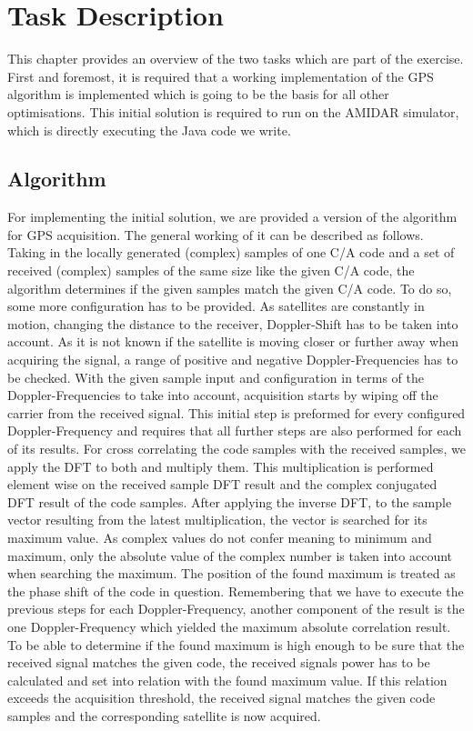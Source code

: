 \chapter{Task Description}
\label{cha:task}
	This chapter provides an overview of the two tasks which are part of the exercise.
	First and foremost, it is required that a working implementation of the GPS algorithm is implemented which is going to be the basis for all other optimisations. This initial solution is required to run on the AMIDAR simulator, which is directly executing the Java code we write.

	\section{Algorithm} %
	\label{sec:task_algorithm}
		For implementing the initial solution, we are provided a version of the algorithm for GPS acquisition. The general working of it can be described as follows.
		Taking in the locally generated (complex) samples of one C/A code and a set of received (complex) samples of the same size like the given C/A code, the algorithm determines if the given samples match the given C/A code. 
		To do so, some more configuration has to be provided. As satellites are constantly in motion, changing the distance to the receiver, Doppler-Shift has to be taken into account. As it is not known if the satellite is moving closer or further away when acquiring the signal, a range of positive and negative Doppler-Frequencies has to be checked. With the given sample input and configuration in terms of the Doppler-Frequencies to take into account, acquisition starts by wiping off the carrier from the received signal. This initial step is preformed for every configured Doppler-Frequency and requires that all further steps are also performed for each of its results. 
		For cross correlating the code samples with the received samples, we apply the DFT to both and multiply them. This multiplication is performed element wise on the received sample DFT result and the complex conjugated DFT result of the code samples.
		After applying the inverse DFT, to the sample vector resulting from the latest multiplication, the vector is searched for its maximum value. As complex values do not confer meaning to minimum and maximum, only the absolute value of the complex number is taken into account when searching the maximum. The position of the found maximum is treated as the phase shift of the code in question. 
		Remembering that we have to execute the previous steps for each Doppler-Frequency, another component of the result is the one Doppler-Frequency which yielded the maximum absolute correlation result. 
		To be able to determine if the found maximum is high enough to be sure that the received signal matches the given code, the received signals power has to be calculated and set into relation with the found maximum value. If this relation exceeds the acquisition threshold, the received signal matches the given code samples and the corresponding satellite is now acquired.

